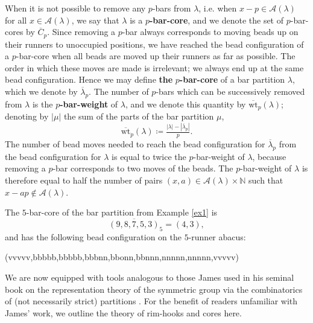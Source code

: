 \documentclass[ALCO, Unicode,published]{cedram}
\begin{document}
When it is not possible to remove any $p$-bars from $\lambda$, i.e. when $x-p\in\mathcal{A}(\lambda)$ for all $x\in\mathcal{A}(\lambda)$, we say that $\lambda$ is a $p$\textbf{-bar-core}, and we denote the set of $p$-bar-cores by $\overline{C}_p$. 
\newline
Since removing a $p$-bar always corresponds to moving beads up on their runners to unoccupied positions, we have reached the bead configuration of a $p$-bar-core when all beads are moved up their runners as far as possible. 
The order in which these moves are made is irrelevant; we always end up at the same bead configuration. 
Hence we may define \textbf{the} $p$\textbf{-bar-core} of a bar partition $\lambda$, which we denote by $\overline{\lambda}_p$. 
The number of $p$-bars which can be successively removed from $\lambda$ is the $p$\textbf{-bar-weight} of $\lambda$, and we denote this quantity by $\overline{\text{wt}}_p(\lambda)$; denoting by $|\mu|$ the sum of the parts of the bar partition $\mu$, 
$$\overline{\text{wt}}_p(\lambda)\coloneqq\tfrac{|\lambda|-|\overline{\lambda}_p|}{p}.$$ 
The number of bead moves needed to reach the bead configuration for $\overline{\lambda}_p$ from the bead configuration for $\lambda$ is equal to twice the $p$-bar-weight of $\lambda$, because removing a $p$-bar corresponds to two moves of the beads. 
The $p$-bar-weight of $\lambda$ is therefore equal to half the number of pairs $(x,a)\in\mathcal{A}(\lambda)\times\mathbb{N}$ such that $x-ap\not\in\mathcal{A}(\lambda)$. 

\begin{exam}\label{ex2}
The $5$-bar-core of the bar partition from Example \ref{ex1} is 
$$\overline{(9,8,7,5,3)}_5=(4,3),$$ 
and has the following bead configuration on the $5$-runner abacus: 
\begin{center}\abacus(vvvvv,bbbbb,bbbbb,bbbnn,bbonn,bbnnn,nnnnn,nnnnn,vvvvv)\end{center}
\end{exam}

We are now equipped with tools analogous to those James used in his seminal book on the representation theory of the symmetric group via the combinatorics of (not necessarily strict) partitions \cite{JK}. For the benefit of readers unfamiliar with James' work, we outline the theory of rim-hooks and cores here.
\end{document}
